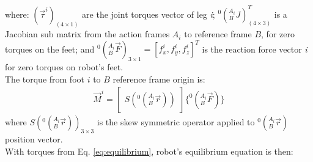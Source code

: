 \documentclass[]{article}
\begin{document}
where: $(\vec{\tau}^i)_{(4\times1)}$ are the joint torques vector of leg \textit{i}; $^0(_B^{A_i}J)^T_{(4\times 3)}$ is a Jacobian sub matrix from the action frames $A_i$ to reference frame $B$, for zero torques on the feet; and $^0(_B^{A_i}\vec{F})_{3\times1}=[f_x^i,f_y^i,f_z^i]^T$ is the reaction force vector \textit{i} for zero torques on robot's feet.\\
The torque from foot $i$ to $B$ reference frame origin is:
\begin{eqnarray}
\vec{M}^i=%
\begin{bmatrix}
S(^0(_B^{A_i}\vec{r}))
\end{bmatrix}
\{^0(_B^{A_i}\vec{F})\}
\label{eq:equilibrium}
\end{eqnarray}
where $S(^0(_B^{A_i}\vec{r}))_{3 \times 3}$ is the skew symmetric operator applied to $^0(_B^{A_i}\vec{r})$ position vector.\\
With torques from Eq. \ref{eq:equilibrium}, robot's equilibrium equation is then:
\end{document}
